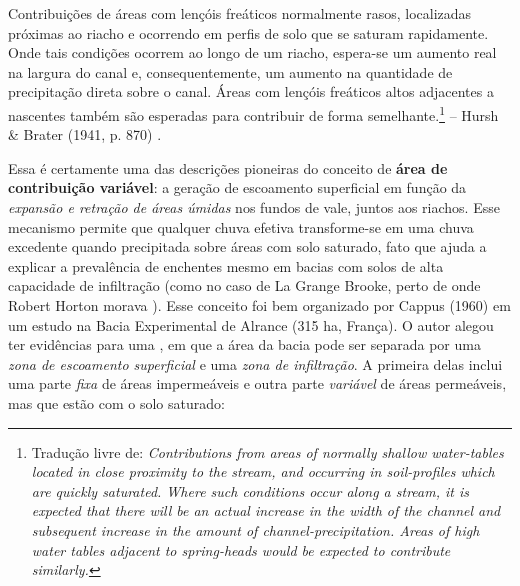 \documentclass[./main.tex]{subfiles}
\begin{document}
\begin{adjustwidth}{100pt}{0pt}
\medskip
\small Contribuições de áreas com lençóis freáticos normalmente rasos, localizadas próximas ao riacho e ocorrendo em perfis de solo que se saturam rapidamente. Onde tais condições ocorrem ao longo de um riacho, espera-se um aumento real na largura do canal e, consequentemente, um aumento na quantidade de precipitação direta sobre o canal. Áreas com lençóis freáticos altos adjacentes a nascentes também são esperadas para contribuir de forma semelhante.\footnote{Tradução livre de: \textit{Contributions from areas of normally shallow water-tables located in close proximity to the stream, and occurring in soil-profiles which are quickly saturated. Where such conditions occur along a stream, it is expected that there will be an actual increase in the width of the channel and subsequent increase in the amount of channel-precipitation. Areas of high water tables adjacent to spring-heads would be expected to contribute similarly.}} -- Hursh \& Brater (1941, p. 870) \cite{Hursh1941}.
\medskip
\end{adjustwidth}

\noindent Essa é certamente uma das descrições pioneiras do conceito de \textbf{área de contribuição variável}: a geração de escoamento superficial em função da \textit{expansão e retração de áreas úmidas} nos fundos de vale, juntos aos riachos. Esse mecanismo permite que qualquer chuva efetiva transforme-se em uma chuva excedente quando precipitada sobre áreas com solo saturado, fato que ajuda a explicar a prevalência de enchentes mesmo em bacias com solos de alta capacidade de infiltração (como no caso de La Grange Brooke, perto de onde Robert Horton morava \cite{Beven2004c}). Esse conceito foi bem organizado por Cappus (1960) \cite{Cappus1960} em um estudo na Bacia Experimental de Alrance (315 ha, França). O autor alegou ter evidências para uma , em que a área da bacia pode ser separada por uma \textit{zona de escoamento superficial} e uma \textit{zona de infiltração}. A primeira delas inclui uma parte \textit{fixa} de áreas impermeáveis e outra parte \textit{variável} de áreas permeáveis, mas que estão com o solo saturado:
\end{document}
